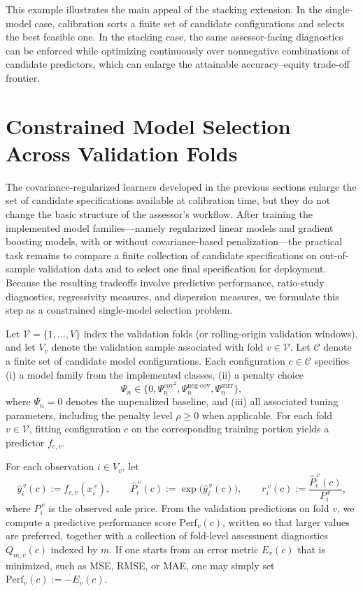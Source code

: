 \documentclass[12pt, draft]{article}
\theoremstyle{plain}
\theoremstyle{definition}
\newcommand{\1}{\mathbf{1}}
\begin{document}
This example illustrates the main appeal of the stacking extension. In the single-model case, calibration sorts a finite set of candidate configurations and selects the best feasible one. In the stacking case, the same assessor-facing diagnostics can be enforced while optimizing continuously over nonnegative combinations of candidate predictors, which can enlarge the attainable accuracy--equity trade-off frontier.

\section{Constrained Model Selection Across Validation Folds}
\label{sec:model_selection}

The covariance-regularized learners developed in the previous sections enlarge the set of candidate specifications available at calibration time, but they do not change the basic structure of the assessor's workflow. After training the implemented model families---namely regularized linear models and gradient boosting models, with or without covariance-based penalization---the practical task remains to compare a finite collection of candidate specifications on out-of-sample validation data and to select one final specification for deployment. Because the resulting tradeoffs involve predictive performance, ratio-study diagnostics, regressivity measures, and dispersion measures, we formulate this step as a constrained single-model selection problem.

Let $\mathcal V=\{1,\dots,V\}$ index the validation folds (or rolling-origin validation windows), and let $V_v$ denote the validation sample associated with fold $v\in\mathcal V$. Let $\mathcal C$ denote a finite set of candidate model configurations. Each configuration $c\in\mathcal C$ specifies
(i) a model family from the implemented classes,
(ii) a penalty choice
\[
\Psi_n \in \{0,\Psi_n^{\mathrm{cov}^2},\Psi_n^{\mathrm{neg\mbox{-}cov}},\Psi_n^{\mathrm{surr}}\},
\]
where $\Psi_n=0$ denotes the unpenalized baseline, and
(iii) all associated tuning parameters, including the penalty level $\rho\ge 0$ when applicable.
For each fold $v\in\mathcal V$, fitting configuration $c$ on the corresponding training portion yields a predictor $f_{c,v}$.

For each observation $i\in V_v$, let
\[
\hat y_i^{\,v}(c):=f_{c,v}(x_i^{\,v}),
\qquad
\hat P_i^{\,v}(c):=\exp\!\bigl(\hat y_i^{\,v}(c)\bigr),
\qquad
r_i^{\,v}(c):=\frac{\hat P_i^{\,v}(c)}{P_i^{\,v}},
\]
where $P_i^{\,v}$ is the observed sale price. From the validation predictions on fold $v$, we compute a predictive performance score $\mathrm{Perf}_v(c)$, written so that larger values are preferred, together with a collection of fold-level assessment diagnostics $Q_{m,v}(c)$ indexed by $m$. If one starts from an error metric $E_v(c)$ that is minimized, such as MSE, RMSE, or MAE, one may simply set $\mathrm{Perf}_v(c):=-E_v(c)$.
\end{document}
